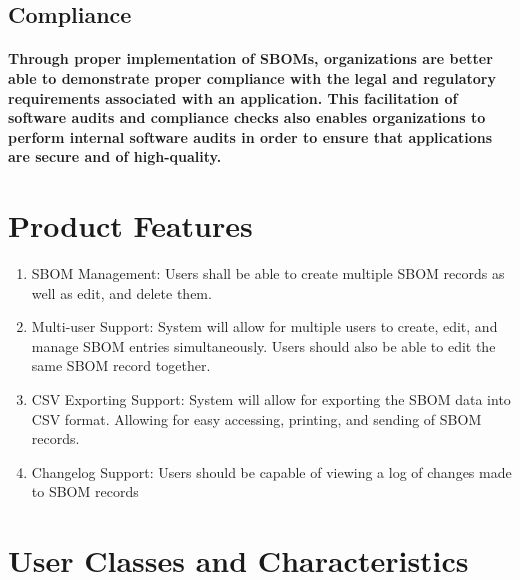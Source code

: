 \documentclass[letterpaper,12pt,oneside,listof=totoc]{scrreprt}
\begin{document}
\subsection{Compliance}
    \paragraph{ \normalfont
    Through proper implementation of SBOMs, organizations are better able to demonstrate proper compliance with the legal and regulatory requirements associated with an application. This facilitation of software audits and compliance checks also enables organizations to perform internal software audits in order to ensure that applications are secure and of high-quality.
}


\section{Product Features}
\begin{enumerate}
    \item SBOM Management: 
    Users shall be able to create multiple SBOM records as well as edit, and delete them. 

    \item Multi-user Support: 
 System will allow for multiple users to create, edit, and manage SBOM entries simultaneously. Users should also be able to edit the same SBOM record together. 

    \item CSV Exporting Support: 
 System will allow for exporting the SBOM data into CSV format.  Allowing for easy accessing, printing, and sending of SBOM records. 

    \item Changelog Support: 
 Users should be capable of viewing a log of changes made to SBOM records \
\end{enumerate}

\section{User Classes and Characteristics}
\end{document}

